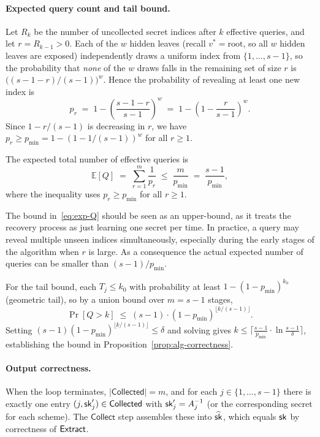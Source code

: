 \paragraph{Expected query count and tail bound.}
Let $R_k$ be the number of uncollected secret indices after $k$ effective
queries, and let $r = R_{k-1} > 0$.  Each of the $w$ hidden leaves
(recall $v^* = \mathrm{root}$, so all $w$ hidden leaves are exposed)
independently draws a uniform index from $\{1,\ldots,s-1\}$,
so the probability that \emph{none} of the $w$ draws falls in the
remaining set of size $r$ is $\bigl((s-1-r)/(s-1)\bigr)^{w}$.
Hence the probability of revealing at least one new index is
\begin{equation}
  p_r \;=\; 1 - \left(\frac{s-1-r}{s-1}\right)^{\!w}
           \;=\; 1 - \left(1 - \frac{r}{s-1}\right)^{\!w}.
  \label{eq:pr-exact}
\end{equation}
Since $1 - r/(s-1)$ is decreasing in $r$, we have
$p_r \geq p_{\min} = 1-(1-1/(s-1))^w$ for all $r \geq 1$.

The expected total number of effective queries is
\begin{equation}
  \mathbb{E}[Q] \;=\; \sum_{r=1}^{m} \frac{1}{p_r}
  \;\leq\; \frac{m}{p_{\min}} \;=\; \frac{s-1}{p_{\min}},
  \label{eq:exp-Q}
\end{equation}
where the inequality uses $p_r \geq p_{\min}$ for all $r \geq 1$.

\begin{remark}
The bound in~\eqref{eq:exp-Q} should be seen as an upper-bound, 
as it treats the recovery process as just learning one secret 
per time. In practice, a query may reveal multiple unseen indices 
simultaneously, especially during the early stages of the 
algorithm when $r$ is large. As a consequence the actual expected 
number of queries can be smaller than $(s-1)/p_{\min}$.
\end{remark}


For the tail bound, each $T_j \leq k_0$ with probability at least
$1 - (1 - p_{\min})^{k_0}$ (geometric tail), so by a union bound over
$m = s-1$ stages,
\[
  \Pr[Q > k] \;\leq\; (s-1)\cdot(1-p_{\min})^{\lfloor k/(s-1)\rfloor}.
\]
Setting $(s-1)(1-p_{\min})^{\lfloor k/(s-1)\rfloor} \leq \delta$ and
solving gives $k \leq \bigl\lceil \tfrac{s-1}{p_{\min}} \cdot
\ln\tfrac{s-1}{\delta} \bigr\rceil$, establishing the bound in
Proposition~\ref{prop:alg-correctness}.


\paragraph{Output correctness.}
When the loop terminates, $|\mathsf{Collected}| = m$, and for each
$j \in \{1,\ldots,s-1\}$ there is exactly one entry $(j, \mathsf{sk}'_j) \in \mathsf{Collected}$
with $\mathsf{sk}'_j = A_j^{-1}$ (or the corresponding secret for each scheme).
The $\mathsf{Collect}$ step assembles these into $\widehat{\mathsf{sk}}$, which equals $\mathsf{sk}$
by correctness of $\mathsf{Extract}$.

